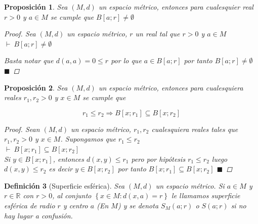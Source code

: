 \documentclass[oneside]{book} %
\theoremstyle{Teorema}
\newtheorem{Definicion}{Definición}[chapter]
\newtheorem{Proposicion}[Definicion]{Proposición}
\theoremstyle{Ejemplos}
\theoremstyle{[Obs]}
\renewcommand{\{}{\left\lbrace} %
\renewcommand{\}}{\right\rbrace} %
\renewcommand{\sc}{\subseteq} %
\newcommand{\R}{\mathbb{R}} %
\renewcommand{\qed}{$\blacksquare$} %
\newcommand{\pd}{$\vdash\ $} %
\begin{document}
			\begin{Proposicion}\setlength{\parindent}{0em}
				
				Sea $(M, d)$ un espacio métrico, entonces para cualesquier real $r > 0$ y $a \in M$ se cumple que $B[a;r] \neq \emptyset$ 

				\begin{proof}
					
					Sea $(M, d)$ un espacio métrico, $r$ un real tal que $r > 0$ y $a \in M$ \\ 
					\pd $B[a;r] \neq \emptyset$ 

					Basta notar que $d(a, a) = 0 \leq r$ por lo que $a \in B[a;r]$ por tanto $B[a;r] \neq \emptyset$ \qed

				\end{proof}

			\end{Proposicion}

			\begin{Proposicion}\setlength{\parindent}{0em}
				
				Sea $(M, d)$ un espacio métrico, entonces para cualesquiera reales $r_1, r_2 > 0$ y $x \in M$ se cumple que 
				
				\[ r_1 \leq r_2 \Rightarrow B[x;r_1] \sc B[x;r_2] \] 

				\begin{proof}
					
					Sean $(M, d)$ un espacio métrico, $r_1, r_2$ cualesquiera reales tales que $r_1, r_2 > 0$ y $x \in M$. Supongamos que $r_1 \leq r_2$ \\
					\pd $B[x;r_1] \sc B[x;r_2]$ \\

					Si $y \in B[x;r_1]$, entonces $d(x, y) \leq r_1$ pero por hipótesis $r_1 \leq r_2$ luego $d(x, y) \leq r_2$ es decir $y \in B[x;r_2]$ por tanto $B[x;r_1] \sc B[x;r_2]$ \qed

				\end{proof}

			\end{Proposicion}

			\begin{Definicion}[Superficie esférica]\setlength{\parindent}{0em}
				
				Sea $(M, d)$ un espacio métrico. Si $a \in M$ y $r \in \R$ con $r > 0$, al conjunto $\{ x \in M : d(x, a) = r \}$ le llamamos superficie esférica de radio $r$ y centro $a$ (En $M$) y se denota $S_M(a;r)$ o $S(a;r)$ si no hay lugar a confusión. 

			\end{Definicion}
\end{document}
